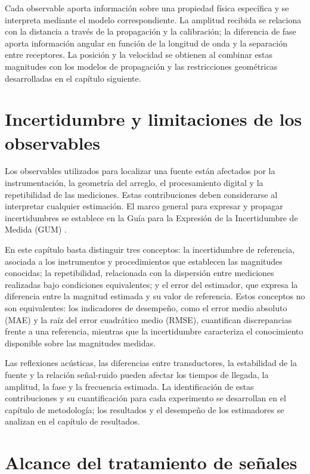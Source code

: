 Cada observable aporta información sobre una propiedad física
específica y se interpreta mediante el modelo correspondiente. La
amplitud recibida se relaciona con la distancia a través de la
propagación y la calibración; la diferencia de fase aporta información
angular en función de la longitud de onda y la separación entre
receptores. La posición y la velocidad se obtienen al combinar estas
magnitudes con los modelos de propagación y las restricciones
geométricas desarrolladas en el capítulo siguiente.

\section{Incertidumbre y limitaciones de los observables}

Los observables utilizados para localizar una fuente están afectados
por la instrumentación, la geometría del arreglo, el procesamiento
digital y la repetibilidad de las mediciones. Estas contribuciones
deben considerarse al interpretar cualquier estimación. El marco general
para expresar y propagar incertidumbres se establece en la Guía para la
Expresión de la Incertidumbre de Medida (GUM)
\cite{jcg2008evaluation,taylor1997introduction}.

En este capítulo basta distinguir tres conceptos: la incertidumbre de
referencia, asociada a los instrumentos y procedimientos que establecen
las magnitudes conocidas; la repetibilidad, relacionada con la
dispersión entre mediciones realizadas bajo condiciones equivalentes;
y el error del estimador, que expresa la diferencia entre la magnitud
estimada y su valor de referencia. Estos conceptos no son equivalentes:
los indicadores de desempeño, como el error medio absoluto (MAE) y la
raíz del error cuadrático medio (RMSE), cuantifican discrepancias frente
a una referencia, mientras que la incertidumbre caracteriza el
conocimiento disponible sobre las magnitudes medidas.

Las reflexiones acústicas, las diferencias entre transductores, la
estabilidad de la fuente y la relación señal-ruido pueden afectar los
tiempos de llegada, la amplitud, la fase y la frecuencia estimada. La
identificación de estas contribuciones y su cuantificación para cada
experimento se desarrollan en el capítulo de metodología; los resultados
y el desempeño de los estimadores se analizan en el capítulo de
resultados.

\section{Alcance del tratamiento de señales}

